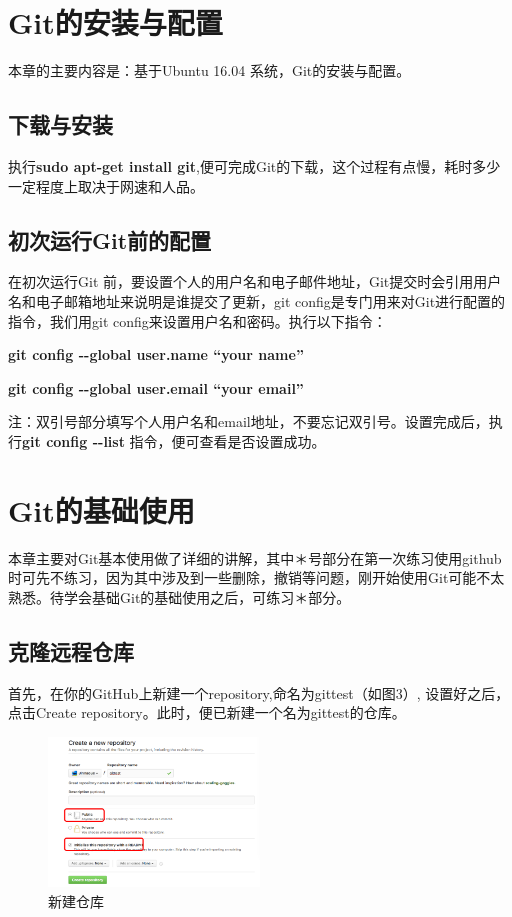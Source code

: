 \documentclass{article}
\begin{document}
\section{Git的安装与配置}
本章的主要内容是：基于Ubuntu 16.04 系统，Git的安装与配置。

\subsection{下载与安装}
执行\textbf{sudo apt-get install git},便可完成Git的下载，这个过程有点慢，耗时多少一定程度上取决于网速和人品。

\subsection{初次运行Git前的配置}
在初次运行Git 前，要设置个人的用户名和电子邮件地址，Git提交时会引用用户名和电子邮箱地址来说明是谁提交了更新，git config是专门用来对Git进行配置的指令，我们用git config来设置用户名和密码。执行以下指令：

\textbf{git config {-}{-}global user.name “your name”}

\textbf{git config {-}{-}global user.email “your email”}

注：双引号部分填写个人用户名和email地址，不要忘记双引号。设置完成后，执行\textbf{git config {-}{-}list }指令，便可查看是否设置成功。

\section{Git的基础使用}

本章主要对Git基本使用做了详细的讲解，其中＊号部分在第一次练习使用github时可先不练习，因为其中涉及到一些删除，撤销等问题，刚开始使用Git可能不太熟悉。待学会基础Git的基础使用之后，可练习＊部分。

\subsection{克隆远程仓库}
首先，在你的GitHub上新建一个repository,命名为gittest（如图3）, 设置好之后，点击Create repository。此时，便已新建一个名为gittest的仓库。

\begin{figure}[!htb] %
\centering \includegraphics[width=0.5\textwidth]{fig3.png} \caption{新建仓库}
\label{fig:1}
\end{figure}
\end{document}
